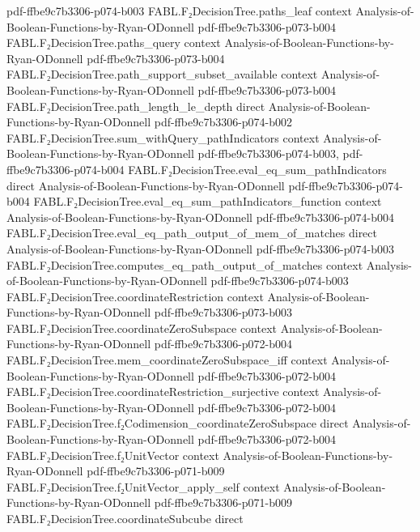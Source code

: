 \begin{theorem}
{    pdf-ffbe9c7b3306-p074-b003}
\proofstep
  {FABL.F₂DecisionTree.paths_leaf}
  {context}
  {Analysis-of-Boolean-Functions-by-Ryan-ODonnell}
  {pdf-ffbe9c7b3306-p073-b004}
\proofstep
  {FABL.F₂DecisionTree.paths_query}
  {context}
  {Analysis-of-Boolean-Functions-by-Ryan-ODonnell}
  {pdf-ffbe9c7b3306-p073-b004}
\proofstep
  {FABL.F₂DecisionTree.path_support_subset_available}
  {context}
  {Analysis-of-Boolean-Functions-by-Ryan-ODonnell}
  {pdf-ffbe9c7b3306-p073-b004}
\proofstep
  {FABL.F₂DecisionTree.path_length_le_depth}
  {direct}
  {Analysis-of-Boolean-Functions-by-Ryan-ODonnell}
  {pdf-ffbe9c7b3306-p074-b002}
\proofstep
  {FABL.F₂DecisionTree.sum_withQuery_pathIndicators}
  {context}
  {Analysis-of-Boolean-Functions-by-Ryan-ODonnell}
  {pdf-ffbe9c7b3306-p074-b003,
    pdf-ffbe9c7b3306-p074-b004}
\proofstep
  {FABL.F₂DecisionTree.eval_eq_sum_pathIndicators}
  {direct}
  {Analysis-of-Boolean-Functions-by-Ryan-ODonnell}
  {pdf-ffbe9c7b3306-p074-b004}
\proofstep
  {FABL.F₂DecisionTree.eval_eq_sum_pathIndicators_function}
  {context}
  {Analysis-of-Boolean-Functions-by-Ryan-ODonnell}
  {pdf-ffbe9c7b3306-p074-b004}
\proofstep
  {FABL.F₂DecisionTree.eval_eq_path_output_of_mem_of_matches}
  {direct}
  {Analysis-of-Boolean-Functions-by-Ryan-ODonnell}
  {pdf-ffbe9c7b3306-p074-b003}
\proofstep
  {FABL.F₂DecisionTree.computes_eq_path_output_of_matches}
  {context}
  {Analysis-of-Boolean-Functions-by-Ryan-ODonnell}
  {pdf-ffbe9c7b3306-p074-b003}
\proofstep
  {FABL.F₂DecisionTree.coordinateRestriction}
  {context}
  {Analysis-of-Boolean-Functions-by-Ryan-ODonnell}
  {pdf-ffbe9c7b3306-p073-b003}
\proofstep
  {FABL.F₂DecisionTree.coordinateZeroSubspace}
  {context}
  {Analysis-of-Boolean-Functions-by-Ryan-ODonnell}
  {pdf-ffbe9c7b3306-p072-b004}
\proofstep
  {FABL.F₂DecisionTree.mem_coordinateZeroSubspace_iff}
  {context}
  {Analysis-of-Boolean-Functions-by-Ryan-ODonnell}
  {pdf-ffbe9c7b3306-p072-b004}
\proofstep
  {FABL.F₂DecisionTree.coordinateRestriction_surjective}
  {context}
  {Analysis-of-Boolean-Functions-by-Ryan-ODonnell}
  {pdf-ffbe9c7b3306-p072-b004}
\proofstep
  {FABL.F₂DecisionTree.f₂Codimension_coordinateZeroSubspace}
  {direct}
  {Analysis-of-Boolean-Functions-by-Ryan-ODonnell}
  {pdf-ffbe9c7b3306-p072-b004}
\proofstep
  {FABL.F₂DecisionTree.f₂UnitVector}
  {context}
  {Analysis-of-Boolean-Functions-by-Ryan-ODonnell}
  {pdf-ffbe9c7b3306-p071-b009}
\proofstep
  {FABL.F₂DecisionTree.f₂UnitVector_apply_self}
  {context}
  {Analysis-of-Boolean-Functions-by-Ryan-ODonnell}
  {pdf-ffbe9c7b3306-p071-b009}
\proofstep
  {FABL.F₂DecisionTree.coordinateSubcube}
  {direct}

\end{theorem}
